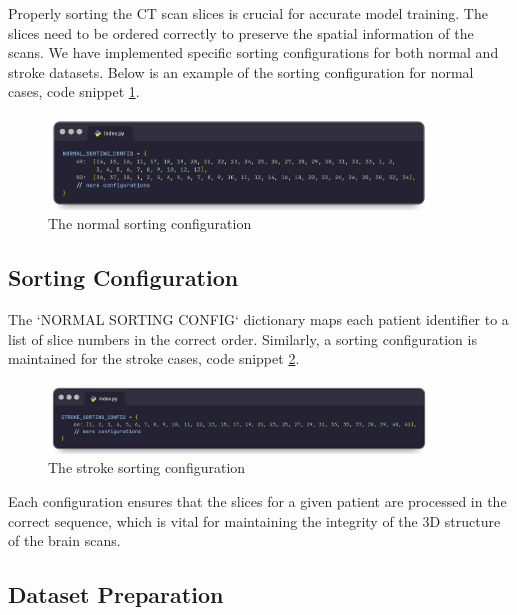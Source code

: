 Properly sorting the CT scan slices is crucial for accurate model training. The slices need to be ordered correctly to preserve the spatial information of the scans. We have implemented specific sorting configurations for both normal and stroke datasets. Below is an example of the sorting configuration for normal cases, code snippet \ref{fig:brain_stroke_norm_config}.
 

\begin{figure}
 \centering
    \includegraphics[width=0.90\textwidth]{Img/Chap-01/29.jpg}
    \caption{The normal sorting configuration}
    \label{fig:brain_stroke_norm_config}
\end{figure}

\subsection{Sorting Configuration}

The `NORMAL SORTING CONFIG` dictionary maps each patient identifier to a list of slice numbers in the correct order. Similarly, a sorting configuration is maintained for the stroke cases, code snippet \ref{fig:brain_stroke_sorting_config}.
 
\begin{figure}
 \centering
    \includegraphics[width=0.90\textwidth]{Img/Chap-01/30.jpg}
    \caption{The stroke sorting configuration}
    \label{fig:brain_stroke_sorting_config}
\end{figure}

Each configuration ensures that the slices for a given patient are processed in the correct sequence, which is vital for maintaining the integrity of the 3D structure of the brain scans. 

\subsection{Dataset Preparation}


